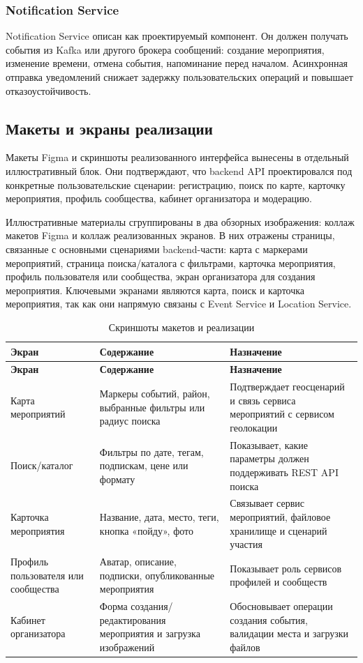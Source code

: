 \subsubsection{Notification Service}

Notification Service описан как проектируемый компонент. Он должен получать события из Kafka или другого брокера сообщений: создание мероприятия, изменение времени, отмена события, напоминание перед началом. Асинхронная отправка уведомлений снижает задержку пользовательских операций и повышает отказоустойчивость.


\subsection{Макеты и экраны реализации}

Макеты Figma и скриншоты реализованного интерфейса вынесены в отдельный иллюстративный блок. Они подтверждают, что backend API проектировался под конкретные пользовательские сценарии: регистрацию, поиск по карте, карточку мероприятия, профиль сообщества, кабинет организатора и модерацию.

Иллюстративные материалы сгруппированы в два обзорных изображения: коллаж макетов Figma и коллаж реализованных экранов. В них отражены страницы, связанные с основными сценариями backend-части: карта с маркерами мероприятий, страница поиска/каталога с фильтрами, карточка мероприятия, профиль пользователя или сообщества, экран организатора для создания мероприятия. Ключевыми экранами являются карта, поиск и карточка мероприятия, так как они напрямую связаны с Event Service и Location Service.

\begin{longtable}{|p{4.2cm}|p{5.8cm}|p{5cm}|}
\caption{Скриншоты макетов и реализации}\label{tab:mockups}\\
\hline
\textbf{Экран} & \textbf{Содержание} & \textbf{Назначение} \\
\hline
\endfirsthead
\hline
\textbf{Экран} & \textbf{Содержание} & \textbf{Назначение} \\
\hline
\endhead
Карта мероприятий & Маркеры событий, район, выбранные фильтры или радиус поиска & Подтверждает геосценарий и связь сервиса мероприятий с сервисом геолокации \\
\hline
Поиск/каталог & Фильтры по дате, тегам, подпискам, цене или формату & Показывает, какие параметры должен поддерживать REST API поиска \\
\hline
Карточка мероприятия & Название, дата, место, теги, кнопка «пойду», фото & Связывает сервис мероприятий, файловое хранилище и сценарий участия \\
\hline
Профиль пользователя или сообщества & Аватар, описание, подписки, опубликованные мероприятия & Показывает роль сервисов профилей и сообществ \\
\hline
Кабинет организатора & Форма создания/редактирования мероприятия и загрузка изображений & Обосновывает операции создания события, валидации места и загрузки файлов \\
\hline
\end{longtable}

